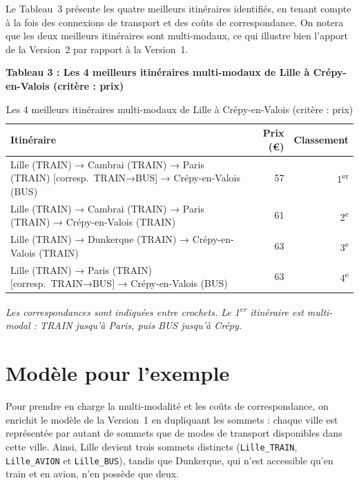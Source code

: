 \documentclass[fontsize=10pt,oneside,parskip=half]{scrreprt}
\newcommand{\ic}[1]{{\setlength{\fboxsep}{2pt}\colorbox{BeigeSerein}{\texttt{#1}}}}
\begin{document}
Le Tableau~3 présente les quatre meilleurs itinéraires identifiés, en tenant compte à
la fois des connexions de transport et des coûts de correspondance. On notera que les
deux meilleurs itinéraires sont multi-modaux, ce qui illustre bien l'apport de la
Version~2 par rapport à la Version~1.

\noindent\textbf{Tableau 3 : Les 4 meilleurs itinéraires multi-modaux de Lille à
Crépy-en-Valois (critère : prix)}

\begin{table}[H]
  \centering
  \small
  \begin{tabularx}{\textwidth}{Xrr}
    \toprule
    \textbf{Itinéraire} & \textbf{Prix (€)} & \textbf{Classement} \\
    \midrule
    Lille (TRAIN) → Cambrai (TRAIN) → Paris (TRAIN) [corresp.\ TRAIN→BUS]
      → Crépy-en-Valois (BUS) & 57 & 1\textsuperscript{er} \\
    Lille (TRAIN) → Cambrai (TRAIN) → Paris (TRAIN) → Crépy-en-Valois (TRAIN)
      & 61 & 2\textsuperscript{e} \\
    Lille (TRAIN) → Dunkerque (TRAIN) → Crépy-en-Valois (TRAIN)
      & 63 & 3\textsuperscript{e} \\
    Lille (TRAIN) → Paris (TRAIN) [corresp.\ TRAIN→BUS] → Crépy-en-Valois (BUS)
      & 63 & 4\textsuperscript{e} \\
    \bottomrule
  \end{tabularx}
  \caption{Les 4 meilleurs itinéraires multi-modaux de Lille à Crépy-en-Valois (critère : prix)}
\end{table}

{\small\itshape Les correspondances sont indiquées entre crochets. Le 1\textsuperscript{er}
itinéraire est multi-modal : TRAIN jusqu'à Paris, puis BUS jusqu'à Crépy.}

\section{Modèle pour l'exemple}

Pour prendre en charge la multi-modalité et les coûts de correspondance, on enrichit le
modèle de la Version~1 en dupliquant les sommets : chaque ville est représentée par
autant de sommets que de modes de transport disponibles dans cette ville. Ainsi, Lille
devient trois sommets distincts (\ic{Lille\_TRAIN}, \ic{Lille\_AVION} et
\ic{Lille\_BUS}), tandis que Dunkerque, qui n'est accessible qu'en train et en avion,
n'en possède que deux.
\end{document}
